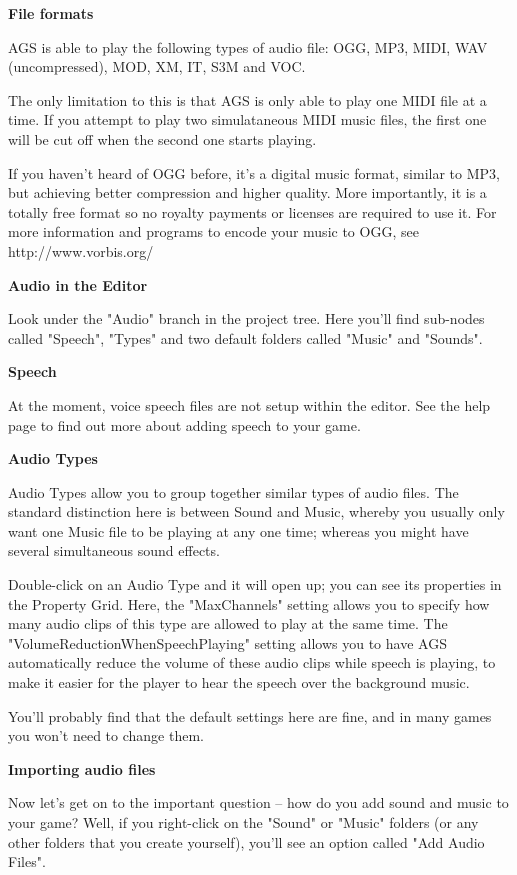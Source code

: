 \bf{File formats}

AGS is able to play the following types of audio file: OGG, MP3, MIDI, WAV (uncompressed),
MOD, XM, IT, S3M and VOC.

The only limitation to this is that AGS is only able to play one MIDI file at a time.
If you attempt to play two simulataneous MIDI music files, the first one will be cut
off when the second one starts playing.

If you haven't heard of OGG before, it's a digital music format, similar to MP3, but achieving
better compression and higher quality. More importantly, it is a totally free format
so no royalty payments or licenses are required to use it. For more information and
programs to encode your music to OGG, see http://www.vorbis.org/

\bf{Audio in the Editor}

Look under the "Audio" branch in the project tree. Here you'll find sub-nodes called
"Speech", "Types" and two default folders called "Music" and "Sounds".

\bf{Speech}

At the moment, voice speech files are not setup within the editor. See the 
help page to find out more about adding speech to your game.

\bf{Audio Types}

Audio Types allow you to group together similar types of audio files. The standard
distinction here is between Sound and Music, whereby you usually only want one Music
file to be playing at any one time; whereas you might have several simultaneous sound
effects.

Double-click on an Audio Type and it will open up; you can see its properties in the
Property Grid. Here, the "MaxChannels" setting allows you to specify how many audio
clips of this type are allowed to play at the same time. The "VolumeReductionWhenSpeechPlaying"
setting allows you to have AGS automatically reduce the volume of these audio clips while
speech is playing, to make it easier for the player to hear the speech over the background
music.

You'll probably find that the default settings here are fine, and in many games you won't
need to change them.

\bf{Importing audio files}

Now let's get on to the important question -- how do you add sound and music to your game?
Well, if you right-click on the "Sound" or "Music" folders (or any other folders that
you create yourself), you'll see an option called "Add Audio Files".

